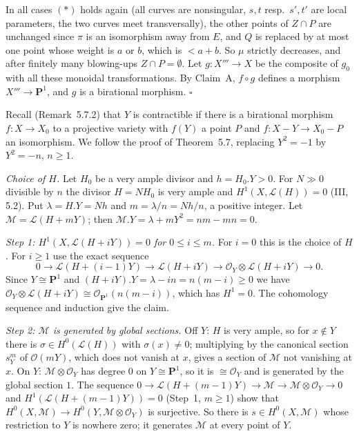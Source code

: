 \documentclass[11pt]{article}
\begin{document}
In all cases $(\ast)$ holds again (all curves are nonsingular, $s,t$ resp.\ $s',t'$ are local parameters, the two curves meet transversally), the other points of $Z\cap P$ are unchanged since $\pi$ is an isomorphism away from $E$, and $Q$ is replaced by at most one point whose weight is $a$ or $b$, which is $<a+b$. So $\mu$ strictly decreases, and after finitely many blowing-ups $Z\cap P=\emptyset$. Let $g:X'''\to X$ be the composite of $g_0$ with all these monoidal transformations. By Claim~A, $f\circ g$ defines a morphism $X'''\to\mathbf P^1$, and $g$ is a birational morphism. \hfill$\square$

\pf
Recall (Remark~5.7.2) that $Y$ is contractible if there is a birational morphism $f:X\to X_0$ to a projective variety with $f(Y)$ a point $P$ and $f:X-Y\to X_0-P$ an isomorphism. We follow the proof of Theorem~5.7, replacing $Y^2=-1$ by $Y^2=-n$, $n\ge1$.

\emph{Choice of $H$.} Let $H_0$ be a very ample divisor and $h=H_0.Y>0$. For $N\gg0$ divisible by $n$ the divisor $H=NH_0$ is very ample and $H^1(X,\mathcal L(H))=0$ (III, 5.2). Put $\lambda=H.Y=Nh$ and $m=\lambda/n=Nh/n$, a positive integer. Let $\mathcal M=\mathcal L(H+mY)$; then $\mathcal M.Y=\lambda+mY^2=nm-mn=0$.

\emph{Step 1: $H^1(X,\mathcal L(H+iY))=0$ for $0\le i\le m$.} For $i=0$ this is the choice of $H$. For $i\ge1$ use the exact sequence
\[
0\to\mathcal L(H+(i-1)Y)\to\mathcal L(H+iY)\to\mathcal O_Y\otimes\mathcal L(H+iY)\to0 .
\]
Since $Y\cong\mathbf P^1$ and $(H+iY).Y=\lambda-in=n(m-i)\ge0$ we have $\mathcal O_Y\otimes\mathcal L(H+iY)\cong\mathcal O_{\mathbf P^1}(n(m-i))$, which has $H^1=0$. The cohomology sequence and induction give the claim.

\emph{Step 2: $\mathcal M$ is generated by global sections.} Off $Y$: $H$ is very ample, so for $x\notin Y$ there is $\sigma\in H^0(\mathcal L(H))$ with $\sigma(x)\ne0$; multiplying by the canonical section $s_Y^m$ of $\mathcal O(mY)$, which does not vanish at $x$, gives a section of $\mathcal M$ not vanishing at $x$. On $Y$: $\mathcal M\otimes\mathcal O_Y$ has degree $0$ on $Y\cong\mathbf P^1$, so it is $\cong\mathcal O_Y$ and is generated by the global section $1$. The sequence $0\to\mathcal L(H+(m-1)Y)\to\mathcal M\to\mathcal M\otimes\mathcal O_Y\to0$ and $H^1(\mathcal L(H+(m-1)Y))=0$ (Step~1, $m\ge1$) show that $H^0(X,\mathcal M)\to H^0(Y,\mathcal M\otimes\mathcal O_Y)$ is surjective. So there is $s\in H^0(X,\mathcal M)$ whose restriction to $Y$ is nowhere zero; it generates $\mathcal M$ at every point of $Y$.
\end{document}
